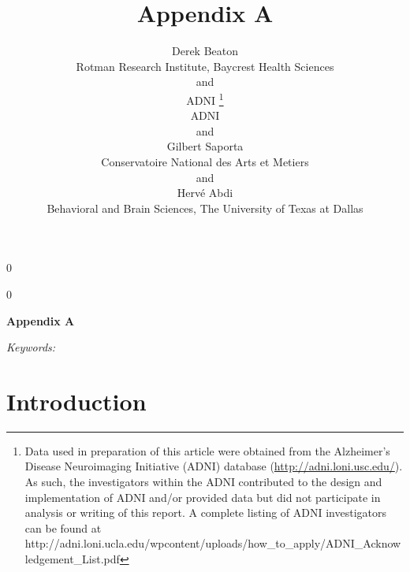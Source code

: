\documentclass[12pt]{article}
\newcommand{\blind}{0}
\begin{document}
\def\spacingset#1{\renewcommand{\baselinestretch}%
{#1}\small\normalsize} \spacingset{1}



\blind
{
  \title{\bf Appendix A}

  \author{
        Derek Beaton \\
    Rotman Research Institute, Baycrest Health Sciences\\
     and \\     ADNI \thanks{Data used in preparation of this article were obtained from the
Alzheimer's Disease Neuroimaging Initiative (ADNI) database
(\url{http://adni.loni.usc.edu/}). As such, the investigators within the
ADNI contributed to the design and implementation of ADNI and/or
provided data but did not participate in analysis or writing of this
report. A complete listing of ADNI investigators can be found at
http://adni.loni.ucla.edu/wpcontent/uploads/how\_to\_apply/ADNI\_Acknowledgement\_List.pdf} \\
    ADNI\\
     and \\     Gilbert Saporta \\
    Conservatoire National des Arts et Metiers\\
     and \\     Hervé Abdi \\
    Behavioral and Brain Sciences, The University of Texas at Dallas\\
      }
  \maketitle
} \fi

\blind
{
  \bigskip
  \bigskip
  \bigskip
  \begin{center}
    {\LARGE\bf Appendix A}
  \end{center}
  \medskip
} \fi

\bigskip
\begin{abstract}

\end{abstract}

\noindent%
{\it Keywords:} 
\vfill

\newpage
\spacingset{1.45} %

\hypertarget{introduction}{%
\section{Introduction}\label{introduction}}
\end{document}
